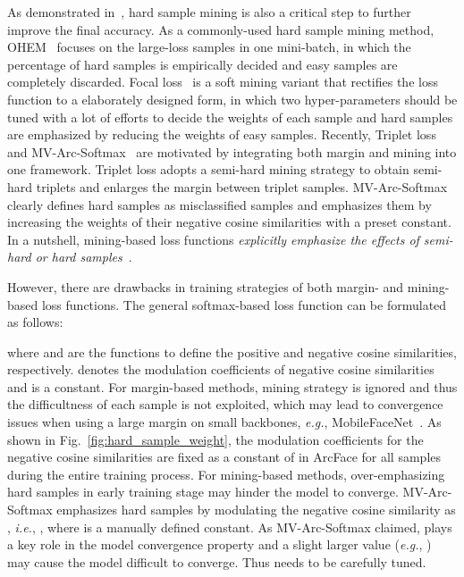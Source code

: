 \documentclass[10pt,twocolumn,letterpaper]{article}
\begin{document}
As demonstrated in~\cite{chen2019angular,huang2020distribution}, hard sample mining is also a critical step to further improve the final accuracy.
As a commonly-used hard sample mining method, OHEM~\cite{shrivastava2016training} focuses on the large-loss samples in one mini-batch, in which the percentage of hard samples is empirically decided and easy samples are completely discarded.
Focal loss~\cite{lin2017focal} is a soft mining variant that rectifies the loss function to a elaborately designed form, in which two hyper-parameters should be tuned with a lot of efforts to decide the weights of each sample and hard samples are emphasized by reducing the weights of easy samples.
Recently, Triplet loss~\cite{schroff2015facenet} and MV-Arc-Softmax~\cite{wang2018support} are motivated by integrating both margin and mining into one framework.
Triplet loss adopts a semi-hard mining strategy to obtain semi-hard triplets and enlarges the margin between triplet samples.
MV-Arc-Softmax~\cite{wang2018support} clearly defines hard samples as misclassified samples and emphasizes them by increasing the weights of their negative cosine similarities with a preset constant.
In a nutshell, mining-based loss functions \textit{explicitly emphasize the effects of semi-hard or hard samples~\cite{schroff2015facenet}}.

However, there are drawbacks in training strategies of both margin- and mining-based loss functions. The general softmax-based loss function can be formulated as follows:

where  and  are the functions to define the positive and negative cosine similarities, respectively.  denotes the modulation coefficients of negative cosine similarities and   is a constant.
For margin-based methods, mining strategy is ignored and thus the difficultness of each sample is not exploited, which may lead to convergence issues when using a large margin on small backbones, \textit{e.g.}, MobileFaceNet~\cite{chen2018mobilefacenets}.
As shown in Fig.~\ref{fig:hard_sample_weight}, the modulation coefficients  for the negative cosine similarities are fixed as a constant of  in ArcFace for all samples during the entire training process.
For mining-based methods, over-emphasizing hard samples in early training stage may hinder the model to converge. MV-Arc-Softmax emphasizes hard samples by modulating the negative cosine similarity as , \textit{i.e.}, , where  is a manually defined constant.
As MV-Arc-Softmax claimed,  plays a key role in the model convergence property and a slight larger value (\textit{e.g.}, ) may cause the model difficult to converge.
Thus  needs to be carefully tuned.
\end{document}
